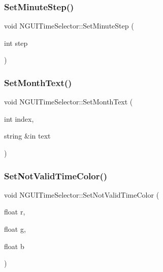 \hypertarget{class_n_g_u_i_time_selector_ae852735618e62beaf0cd1af2a1040976}{}\label{class_n_g_u_i_time_selector_ae852735618e62beaf0cd1af2a1040976} 
\subsubsection{\texorpdfstring{Set\+Minute\+Step()}{SetMinuteStep()}}
{\footnotesize\ttfamily void N\+G\+U\+I\+Time\+Selector\+::\+Set\+Minute\+Step (\begin{DoxyParamCaption}\item[{int}]{step }\end{DoxyParamCaption})}

\hypertarget{class_n_g_u_i_time_selector_a689f085836c87c7ef645125d7094401d}{}\label{class_n_g_u_i_time_selector_a689f085836c87c7ef645125d7094401d} 
\subsubsection{\texorpdfstring{Set\+Month\+Text()}{SetMonthText()}}
{\footnotesize\ttfamily void N\+G\+U\+I\+Time\+Selector\+::\+Set\+Month\+Text (\begin{DoxyParamCaption}\item[{int}]{index,  }\item[{string \&in}]{text }\end{DoxyParamCaption})}

\hypertarget{class_n_g_u_i_time_selector_a5489b364a57baf683870b1d739702242}{}\label{class_n_g_u_i_time_selector_a5489b364a57baf683870b1d739702242} 
\subsubsection{\texorpdfstring{Set\+Not\+Valid\+Time\+Color()}{SetNotValidTimeColor()}}
{\footnotesize\ttfamily void N\+G\+U\+I\+Time\+Selector\+::\+Set\+Not\+Valid\+Time\+Color (\begin{DoxyParamCaption}\item[{float}]{r,  }\item[{float}]{g,  }\item[{float}]{b }\end{DoxyParamCaption})}

